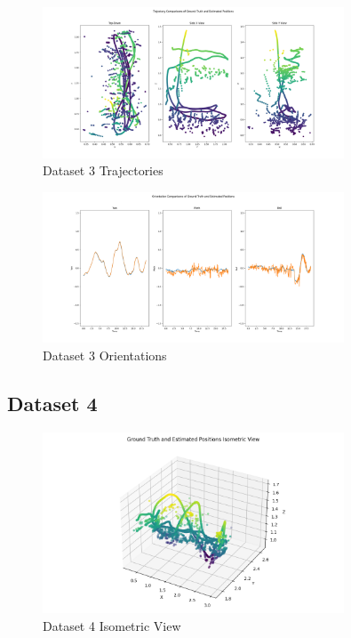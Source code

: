 \documentclass{article}
\begin{document}
\begin{figure}[H]
    \centering
    \includegraphics[width=0.8\textwidth]{./imgs/task1_2/studentdata3_trajectory_merged.png}
    \caption{Dataset 3 Trajectories}
\end{figure}

\begin{figure}[H]
    \centering
    \includegraphics[width=0.8\textwidth]{./imgs/task1_2/studentdata3_orientation_merged.png}
    \caption{Dataset 3 Orientations}
\end{figure}

\subsection*{Dataset 4}

\begin{figure}[H]
    \centering
    \includegraphics[width=0.8\textwidth]{./imgs/task1_2/studentdata4_isometric.png}
    \caption{Dataset 4 Isometric View}
\end{figure}
\end{document}
